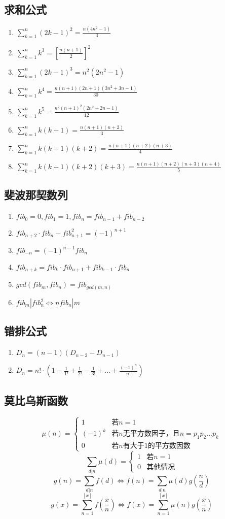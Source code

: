 \subsection{求和公式}
	\begin{enumerate}
		\item $\sum_{k=1}^{n}(2k-1)^2 = \frac{n(4n^2-1)}{3}	$
		\item $\sum_{k=1}^{n}k^3 = [\frac{n(n+1)}{2}]^2	$
		\item $\sum_{k=1}^{n}(2k-1)^3 = n^2(2n^2-1)	$
		\item $\sum_{k=1}^{n}k^4 = \frac{n(n+1)(2n+1)(3n^2+3n-1)}{30}  $
		\item $\sum_{k=1}^{n}k^5 = \frac{n^2(n+1)^2(2n^2+2n-1)}{12}	$
		\item $\sum_{k=1}^{n}k(k+1) = \frac{n(n+1)(n+2)}{3}	$
		\item $\sum_{k=1}^{n}k(k+1)(k+2) = \frac{n(n+1)(n+2)(n+3)}{4} $
		\item $\sum_{k=1}^{n}k(k+1)(k+2)(k+3) = \frac{n(n+1)(n+2)(n+3)(n+4)}{5} $
	\end{enumerate}
\subsection{斐波那契数列}
	\begin{enumerate}
		\item $fib_0=0, fib_1=1, fib_n=fib_{n-1}+fib_{n-2}$
		\item $fib_{n+2} \cdot fib_n-fib_{n+1}^2=(-1)^{n+1}$
		\item $fib_{-n}=(-1)^{n-1}fib_n$
		\item $fib_{n+k}=fib_k \cdot fib_{n+1}+fib_{k-1} \cdot fib_n$
		\item $gcd(fib_m, fib_n)=fib_{gcd(m, n)}$
		\item $fib_m|fib_n^2\Leftrightarrow nfib_n|m$
	\end{enumerate}
\subsection{错排公式}
	\begin{enumerate}
		\item $D_n = (n-1)(D_{n-2}-D_{n-1})$
		\item $D_n = n! \cdot (1-\frac{1}{1!}+\frac{1}{2!}-\frac{1}{3!}+\ldots+\frac{(-1)^n}{n!})$
	\end{enumerate}
\subsection{莫比乌斯函数}
	$$\mu(n) = \begin{cases}
		1 & \text{若}n=1\\
		(-1)^k & \text{若}n\text{无平方数因子，且}n = p_1p_2\dots p_k\\
		0 & \text{若}n\text{有大于}1\text{的平方数因数}
	\end{cases}$$
	$$\sum_{d|n}{\mu(d)} = \begin{cases}
		1 & \text{若}n=1\\
		0 & \text{其他情况}
	\end{cases}$$
	$$g(n) = \sum_{d|n}{f(d)} \Leftrightarrow f(n) = \sum_{d|n}{\mu(d)g(\frac{n}{d})}$$
	$$g(x) = \sum_{n=1}^{[x]}f(\frac{x}{n}) \Leftrightarrow f(x) = \sum_{n=1}^{[x]}{\mu(n)g(\frac{x}{n})}$$
